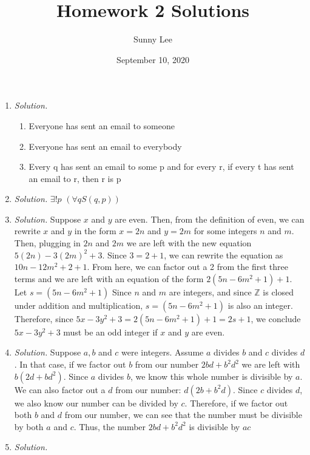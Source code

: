 \documentclass{article}
\title{Homework 2 Solutions}
\author{Sunny Lee}
\date{September 10, 2020}
\newcommand{\zz}{\mathbb Z}
\begin{document}
    \begin{enumerate}
        \item \emph{Solution.}
            \begin{enumerate}
                \item Everyone has sent an email to someone
                \item Everyone has sent an email to everybody
                \item Every q has sent an email to some p and for every r, if every t has sent an email to r, then r is p
            \end{enumerate}
        \item \emph{Solution.} 
            $\exists!p$ $(\forall q S(q, p))$
        \item \emph{Solution.}
            Suppose $x$ and $y$ are even. Then, from the definition of even, we can 
            rewrite $x$ and $y$ in the form $x = 2n$ and $y = 2m$ for some integers
            $n$ and $m$. Then, plugging in $2n$ and $2m$ we are left with the new 
            equation $5(2n) - 3(2m)^2 + 3$. Since $3 = 2 + 1$, we can rewrite the 
            equation as $10n - 12m^2 + 2 + 1$. From here, we can factor out a 2 
            from the first three terms and we are left with an equation of the form
            $2(5n - 6m^2 + 1) + 1$. Let $s = (5n - 6m^2 + 1)$ Since $n$ and $m$ are integers, and since $\zz$ is 
            closed under addition and multiplication, $s = (5n - 6m^2 + 1)$ is also an integer.
            Therefore, since $5x - 3y^2 + 3 = 2(5n - 6m^2 + 1) + 1 = 2s + 1$, 
            we conclude $5x - 3y^2 + 3$ must be an odd integer if $x$ and $y$ are even. 
        \item \emph{Solution.} 
            Suppose $a, b$ and $c$ were integers. Assume $a$ divides $b$ and $c$ divides
            $d$. In that case, if we factor out $b$ from our number $2bd + b^2d^2$
            we are left with $b(2d + bd^2)$. Since $a$ divides $b$, we know this whole 
            number is divisible by $a$. We can also factor out a $d$ from our number: 
            $d(2b + b^2d)$. Since $c$ divides $d$, we also know our number can be divided by 
            $c$. Therefore, if we factor out both $b$ and $d$ from our number, we can see
            that the number must be divisible by both $a$ and $c$. Thus, the number $2bd + b^2d^2$ 
            is divisible by $ac$
        \item \emph{Solution.} 

\end{enumerate}
\end{document}
